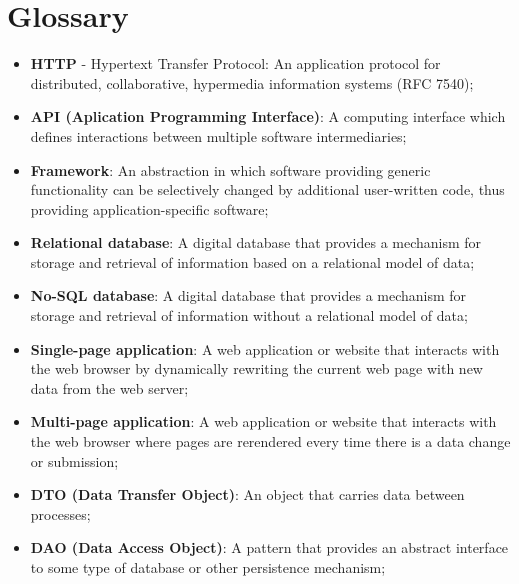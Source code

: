 \chapter*{Glossary}

\begin{itemize}
    \item \textbf{HTTP} - Hypertext Transfer Protocol: An application protocol for distributed,
     collaborative, hypermedia information systems (RFC 7540);
    \item \textbf{API (Aplication Programming Interface)}: A computing interface which defines
     interactions between multiple software intermediaries;
    \item \textbf{Framework}: An abstraction in which software providing generic functionality can
     be selectively changed by additional user-written code,
     thus providing application-specific software;
     \item \textbf{Relational database}: A digital database that provides a mechanism for storage and
     retrieval of information based on a relational model of data;
     \item \textbf{No-SQL database}: A digital database that provides a mechanism for storage and
     retrieval of information without a relational model of data;
     \item \textbf{Single-page application}: A web application or website that interacts with the web browser by dynamically
     rewriting the current web page with new data from the web server;
     \item \textbf{Multi-page application}: A web application or website that interacts with the web browser where pages
     are rerendered every time there is a data change or submission;
     \item \textbf{DTO (Data Transfer Object)}: An object that carries data between processes;
     \item \textbf{DAO (Data Access Object)}: A pattern that provides an abstract interface to 
     some type of database or other persistence mechanism;
\end{itemize}